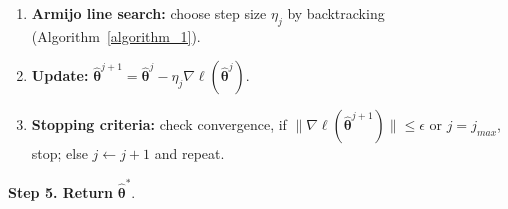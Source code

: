 \begin{center}
\begin{minipage}{0.95\textwidth}
\begin{algorithm}[H]
\begin{enumerate}[label=\arabic*.]
  \item \textbf{Armijo line search:}
    choose step size \(\eta_j\) by backtracking (Algorithm~\ref{algorithm_1}).
  \item \textbf{Update:}
    $\hat{\bm\theta}^{j+1}=\hat{\bm\theta}^j-\eta_j\nabla\ell(\hat{\bm\theta}^j)$.
  \item \textbf{Stopping criteria:}
    check convergence, if $\|\nabla\ell(\hat{\bm\theta}^{j+1})\|\le\epsilon$ or $j=j_{max}$, stop; else $j\leftarrow j+1$ and repeat.
\end{enumerate}
\textbf{Step 5. Return} {$\hat{\bm\theta}^*$}.
\end{algorithm}
\end{minipage}
\end{center}
    








 













